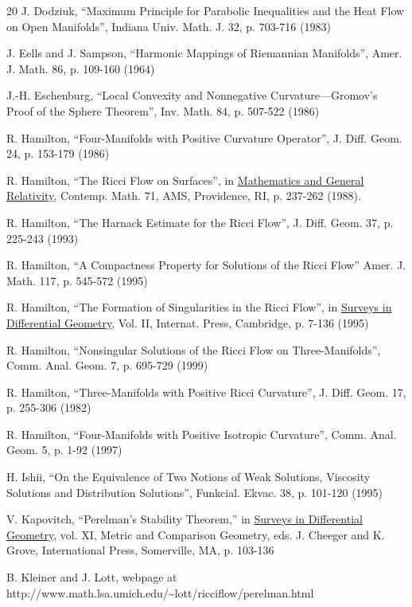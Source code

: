 \begin{thebibliography}{20}
 J. Dodziuk,  ``Maximum Principle for Parabolic
Inequalities and the Heat Flow on Open Manifolds'',
Indiana Univ. Math. J. 32, p. 703-716 (1983)

 J. Eells and J. Sampson,
``Harmonic Mappings of Riemannian Manifolds'',
Amer. J. Math. 86, p. 109-160 (1964)

 J.-H. Eschenburg, ``Local Convexity and Nonnegative
Curvature---Gromov's Proof of the Sphere Theorem'',
Inv. Math. 84, p. 507-522 (1986)

 R. Hamilton,
``Four-Manifolds with Positive Curvature Operator'',
J. Diff. Geom. 24, p. 153-179 (1986)

 R. Hamilton,
``The Ricci Flow on Surfaces'', in
\underline{Mathematics and General Relativity},
Contemp. Math. 71,
AMS, Providence, RI, p. 237-262 (1988).

 R. Hamilton,
``The Harnack Estimate for the Ricci Flow'',
J. Diff. Geom. 37, p. 225-243 (1993)

 R. Hamilton,
``A Compactness Property for Solutions of the Ricci Flow''
Amer. J. Math. 117, p. 545-572 (1995)

 R. Hamilton,
``The Formation of Singularities in the Ricci Flow'', in
\underline{Surveys in Differential Geometry}, Vol. II,
Internat. Press, Cambridge, p. 7-136 (1995)

 R. Hamilton,
``Nonsingular Solutions of the Ricci Flow on Three-Manifolds'',
Comm. Anal. Geom. 7, p. 695-729 (1999)

 R. Hamilton,
``Three-Manifolds with Positive Ricci Curvature'',
J. Diff. Geom. 17, p. 255-306 (1982)

 R. Hamilton,
``Four-Manifolds with Positive Isotropic Curvature'',
Comm. Anal. Geom. 5, p. 1-92 (1997)

 H. Ishii,
``On the Equivalence of Two Notions of Weak Solutions, Viscosity Solutions
and Distribution Solutions'',
Funkcial. Ekvac. 38, p. 101-120 (1995)

 V. Kapovitch, ``Perelman's Stability
Theorem,'' in \underline{Surveys in Differential Geometry},
vol. XI, Metric and Comparison Geometry, eds. J. Cheeger and
K. Grove, International Press, Somerville, MA, p. 103-136

B. Kleiner and J. Lott, webpage at
http://www.math.lsa.umich.edu/\~{}lott/ricciflow/perelman.html


\end{thebibliography}
